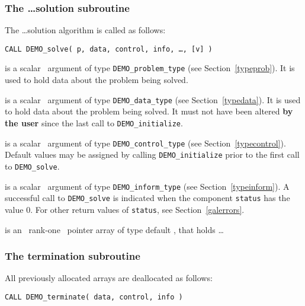 \documentclass{galahad}
\newcommand{\packagename}{DEMO}
\begin{document}

\subsubsection{The \ldots solution subroutine}
The \ldots solution algorithm is called as follows:
\vspace*{1mm}

\hspace{8mm}
{\tt CALL \packagename\_solve( p, data, control, info, \ldots, [v] )}

\vspace*{-3mm}
\begin{description}
 is a scalar \intentinout\ argument of type 
{\tt \packagename\_problem\_type}
(see Section~\ref{typeprob}). 
It is used to hold data about the problem being solved.

 is a scalar \intentinout\ argument of type 
{\tt \packagename\_data\_type}
(see Section~\ref{typedata}). It is used to hold data about the problem being 
solved. It must not have been altered {\bf by the user} since the last call to 
{\tt \packagename\_initialize}.

 is a scalar \intentin\ argument of type 
{\tt \packagename\_control\_type}
(see Section~\ref{typecontrol}). Default values may be assigned by calling 
{\tt \packagename\_initialize} 
prior to the first call to 
{\tt \packagename\_solve}.

 is a scalar \intentout\ argument of type 
{\tt \packagename\_inform\_type}
(see Section~\ref{typeinform}). A successful call to
{\tt \packagename\_solve}
is indicated when the  component {\tt status} has the value 0. 
For other return values of {\tt status}, see Section~\ref{galerrors}.

 is an \optional\ rank-one \intentin\ pointer array of type 
 default \realdp,  that holds \ldots

\end{description}


\subsubsection{The  termination subroutine}
All previously allocated arrays are deallocated as follows:
\vspace*{1mm}

\hspace{8mm}
{\tt CALL \packagename\_terminate( data, control, info )}
\end{document}
